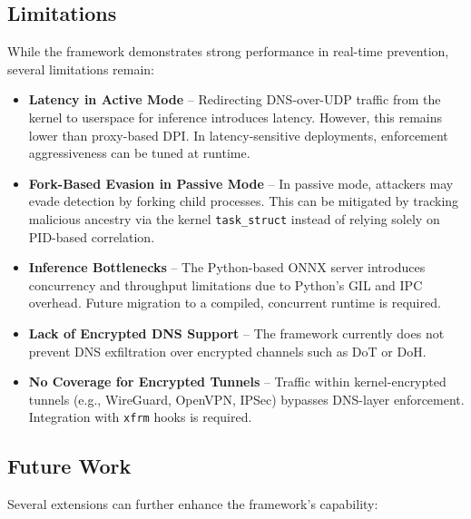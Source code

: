 \documentclass[letterpaper,twocolumn,10pt]{article}
\begin{document}
\subsection{Limitations}
While the framework demonstrates strong performance in real-time prevention, several limitations remain:

\begin{itemize}[nosep]
    \item \textbf{Latency in Active Mode} – Redirecting DNS-over-UDP traffic from the kernel to userspace for inference introduces latency. However, this remains lower than proxy-based DPI. In latency-sensitive deployments, enforcement aggressiveness can be tuned at runtime.
    
    \item \textbf{Fork-Based Evasion in Passive Mode} – In passive mode, attackers may evade detection by forking child processes. This can be mitigated by tracking malicious ancestry via the kernel \texttt{task\_struct} instead of relying solely on PID-based correlation.
    
    \item \textbf{Inference Bottlenecks} – The Python-based ONNX server introduces concurrency and throughput limitations due to Python’s GIL and IPC overhead. Future migration to a compiled, concurrent runtime is required.
    
    \item \textbf{Lack of Encrypted DNS Support} – The framework currently does not prevent DNS exfiltration over encrypted channels such as DoT or DoH.
    
    \item \textbf{No Coverage for Encrypted Tunnels} – Traffic within kernel-encrypted tunnels (e.g., WireGuard, OpenVPN, IPSec) bypasses DNS-layer enforcement. Integration with \texttt{xfrm} hooks is required.
\end{itemize}

\subsection{Future Work}
Several extensions can further enhance the framework’s capability:
\end{document}
